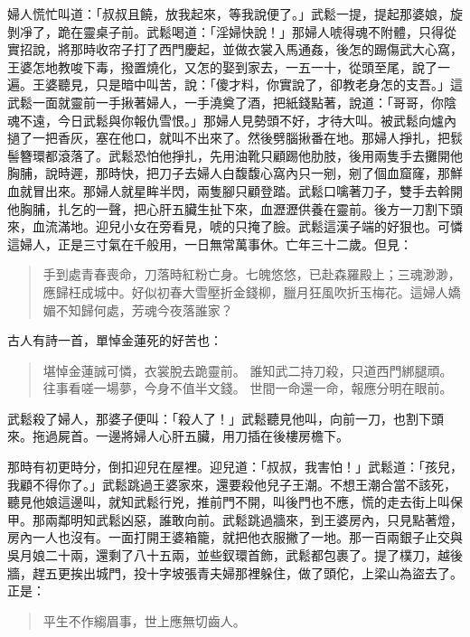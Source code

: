 婦人慌忙叫道：「叔叔且饒，放我起來，等我說便了。」武鬆一提，提起那婆娘，旋剝凈了，跪在靈桌子前。武鬆喝道：「淫婦快說！」那婦人唬得魂不附體，只得從實招說，將那時收帘子打了西門慶起，並做衣裳入馬通姦，後怎的踢傷武大心窩，王婆怎地教唆下毒，撥置燒化，又怎的娶到家去，一五一十，從頭至尾，說了一遍。王婆聽見，只是暗中叫苦，說：「傻才料，你實說了，卻教老身怎的支吾。」這武鬆一面就靈前一手揪著婦人，一手澆奠了酒，把紙錢點著，說道：「哥哥，你陰魂不遠，今日武鬆與你報仇雪恨。」那婦人見勢頭不好，才待大叫。被武鬆向爐內撾了一把香灰，塞在他口，就叫不出來了。然後劈腦揪番在地。那婦人掙扎，把䯼髻簪環都滾落了。武鬆恐怕他掙扎，先用油靴只顧踢他肋肢，後用兩隻手去攤開他胸脯，說時遲，那時快，把刀子去婦人白馥馥心窩內只一剜，剜了個血窟窿，那鮮血就冒出來。那婦人就星眸半閃，兩隻腳只顧登踏。武鬆口噙著刀子，雙手去斡開他胸脯，扎乞的一聲，把心肝五臟生扯下來，血瀝瀝供養在靈前。後方一刀割下頭來，血流滿地。迎兒小女在旁看見，唬的只掩了臉。武鬆這漢子端的好狠也。可憐這婦人，正是三寸氣在千般用，一日無常萬事休。亡年三十二歲。但見：
\begin{quote}
手到處青春喪命，刀落時紅粉亡身。七魄悠悠，已赴森羅殿上；三魂渺渺，應歸枉成城中。好似初春大雪壓折金錢柳，臘月狂風吹折玉梅花。這婦人嬌媚不知歸何處，芳魂今夜落誰家？
\end{quote}

古人有詩一首，單悼金蓮死的好苦也：
\begin{quote}
堪悼金蓮誠可憐，衣裳脫去跪靈前。
誰知武二持刀殺，只道西門綁腿頑。
往事看嗟一場夢，今身不值半文錢。
世間一命還一命，報應分明在眼前。
\end{quote}

武鬆殺了婦人，那婆子便叫：「殺人了！」武鬆聽見他叫，向前一刀，也割下頭來。拖過屍首。一邊將婦人心肝五臟，用刀插在後樓房檐下。

那時有初更時分，倒扣迎兒在屋裡。迎兒道：「叔叔，我害怕！」武鬆道：「孩兒，我顧不得你了。」武鬆跳過王婆家來，還要殺他兒子王潮。不想王潮合當不該死，聽見他娘這邊叫，就知武鬆行兇，推前門不開，叫後門也不應，慌的走去街上叫保甲。那兩鄰明知武鬆凶惡，誰敢向前。武鬆跳過牆來，到王婆房內，只見點著燈，房內一人也沒有。一面打開王婆箱籠，就把他衣服撇了一地。那一百兩銀子止交與吳月娘二十兩，還剩了八十五兩，並些釵環首飾，武鬆都包裹了。提了樸刀，越後牆，趕五更挨出城門，投十字坡張青夫婦那裡躲住，做了頭佗，上梁山為盜去了。正是：
\begin{quote}
平生不作縐眉事，世上應無切齒人。
\end{quote}
